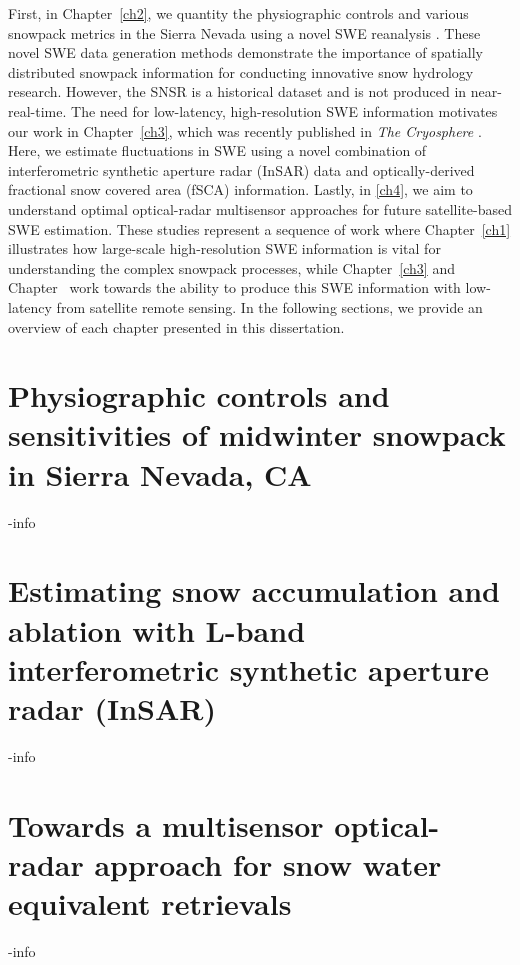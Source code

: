 First, in Chapter~\ref{ch2}, we quantity the physiographic controls and various snowpack metrics in the Sierra Nevada using a novel SWE reanalysis \citep{margulisLandsatEraSierraNevada2016}. These novel SWE data generation methods demonstrate the importance of spatially distributed snowpack information for conducting innovative snow hydrology research. However, the SNSR is a historical dataset and is not produced in near-real-time. The need for low-latency, high-resolution SWE information motivates our work in Chapter~\ref{ch3}, which was recently published in \emph{The Cryosphere} \citep{tarriconeEstimatingSnowAccumulation2023a}. Here, we estimate fluctuations in SWE using a novel combination of interferometric synthetic aperture radar (InSAR) data and optically-derived fractional snow covered area (fSCA) information. Lastly, in \ref{ch4}, we aim to understand optimal optical-radar multisensor approaches for future satellite-based SWE estimation. These studies represent a sequence of work where Chapter~\ref{ch1} illustrates how large-scale high-resolution SWE information is vital for understanding the complex snowpack processes, while Chapter~\ref{ch3} and Chapter~ work towards the ability to produce this SWE information with low-latency from satellite remote sensing. In the following sections, we provide an overview of each chapter presented in this dissertation.

\hypertarget{ch1-intro}{\section{Physiographic controls and sensitivities of midwinter snowpack in Sierra Nevada, CA}\label{ch1-intro}}

-info

\hypertarget{ch1-intro-1}{\section{Estimating snow accumulation and ablation with L-band interferometric synthetic aperture radar (InSAR)}\label{ch1-intro-1}}

-info

\hypertarget{ch1-intro-2}{\section{Towards a multisensor optical-radar approach for snow water equivalent retrievals}\label{ch1-intro-2}}


-info

